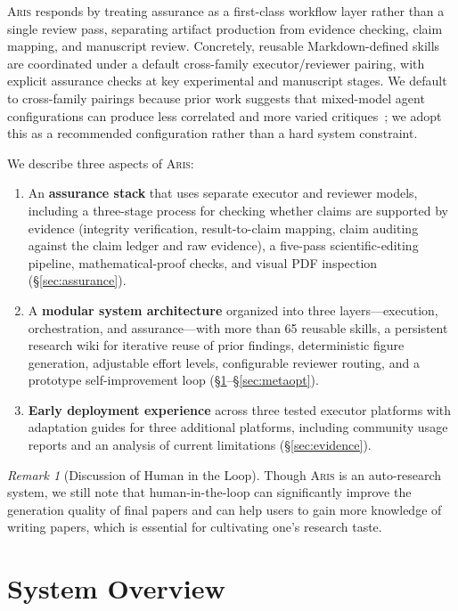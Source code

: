 \documentclass{article}
\newcommand{\aris}{\textsc{Aris}}
\theoremstyle{remark}
\newtheorem{remark}{Remark}
\begin{document}
\aris{} responds by treating assurance as a first-class workflow layer rather than a single review pass, separating artifact production from evidence checking, claim mapping, and manuscript review. Concretely, reusable Markdown-defined skills are coordinated under a default cross-family executor/reviewer pairing, with explicit assurance checks at key experimental and manuscript stages. We default to cross-family pairings because prior work suggests that mixed-model agent configurations can produce less correlated and more varied critiques~\citep{du2024multiagentdebate,liang2024divergent}; we adopt this as a recommended configuration rather than a hard system constraint.

We describe three aspects of \aris{}:
\begin{enumerate}[nosep,leftmargin=*]
    \item An \textbf{assurance stack} that uses separate executor and reviewer models, including a three-stage process for checking whether claims are supported by evidence (integrity verification, result-to-claim mapping, claim auditing against the claim ledger and raw evidence), a five-pass scientific-editing pipeline, mathematical-proof checks, and visual PDF inspection (\S\ref{sec:assurance}).
    \item A \textbf{modular system architecture} organized into three layers---execution, orchestration, and assurance---with more than 65 reusable skills, a persistent research wiki for iterative reuse of prior findings, deterministic figure generation, adjustable effort levels, configurable reviewer routing, and a prototype self-improvement loop (\S\ref{sec:overview}--\S\ref{sec:metaopt}).
    \item \textbf{Early deployment experience} across three tested executor platforms with adaptation guides for three additional platforms, including community usage reports and an analysis of current limitations (\S\ref{sec:evidence}).
\end{enumerate}
\begin{remark}[Discussion of Human in the Loop]
    Though \aris{} is an auto-research system, we still note that human-in-the-loop can significantly improve the generation quality of final papers and can help users to gain more knowledge of writing papers, which is essential for cultivating one's research taste. 
\end{remark}

 \section{System Overview}
\label{sec:overview}
\end{document}
